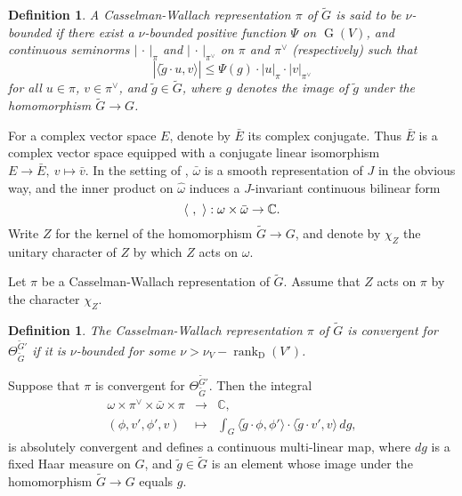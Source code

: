 \documentclass[lang = american]{ems-icm} %
\newcommand{\la}{\langle}
\newcommand{\ra}{\rangle}
\def\abs#1{\left|{#1}\right|}
\newcommand{\rank}{\operatorname{rank}}
\newcommand{\rD}{\mathrm D}
\newcommand{\oG}{\operatorname{G}}
\numberwithin{equation}{section}
\newtheorem{defn}[thm]{Definition}
\theoremstyle{remark}
\begin{document}
\begin{defn}
A Casselman-Wallach representation $\pi$ of $\widetilde G$ is said to be $\nu$-bounded if there
exist a $\nu$-bounded positive function $\Psi$ on $\oG(V)$, and continuous seminorms $\abs{\,\cdot\,}_{\pi}$ and $\abs{\,\cdot\,}_{\pi^\vee}$ on  $ \pi$ and $\pi^\vee$ (respectively) such that
\[
 \abs{ \la \tilde g \cdot u, v\ra}\leq \Psi(g)\cdot \abs{u}_{\pi}\cdot \abs{v}_{\pi^\vee}
\]
for all $u\in \pi$, $v\in \pi^\vee$, and $\tilde g\in \widetilde G$, where $g$ denotes the image of $\tilde g$ under the homomorphism $\widetilde G\rightarrow G$.

\end{defn}



For a complex vector space $E$, denote by $\bar E$ its complex conjugate. Thus $\bar E$ is a complex vector space equipped with a conjugate linear isomorphism  $E\rightarrow \bar E, \ v\mapsto \bar v$. In the setting of , $\bar \omega$ is a smooth representation of $J$ in the obvious way, and the inner product on $\widehat \omega$ induces a $J$-invariant continuous bilinear form
\[
  \langle\ ,\ \rangle :  \omega\times \bar \omega\rightarrow \C.
\]
Write $Z$ for the kernel of the homomorphism $\widetilde G\rightarrow G$, and denote by $\chi_Z$ the unitary character of $Z$ by which $Z$ acts on $\omega$.

Let $\pi$ be a Casselman-Wallach representation of $\widetilde{G}$. Assume that $Z$ acts on $\pi$ by the character $\chi_Z$.

\begin{defn}\label{defn:CRcov}
 The Casselman-Wallach representation $\pi$ of $\widetilde{G}$ is convergent for $\Theta_{\widetilde G}^{\widetilde G'}$ if it is $\nu$-bounded for some $\nu>\nu_{V}-\rank_{\rD}(V')$.
\end{defn}

Suppose that $\pi$ is convergent for $\Theta_{\widetilde G}^{\widetilde G'}$. Then the integral
\begin{equation}\label{mi1}
\begin{array}{rcl}
   \omega\times \pi^\vee \times  \bar \omega\times \pi &\rightarrow & \mathbb C, \\
    (\phi, v', \phi', v)&\mapsto  & \int_{G} \langle \tilde g\cdot\phi, \phi'\rangle \cdot \langle \tilde g\cdot v', v\rangle \, d g,
    \end{array}
\end{equation}
is absolutely convergent and defines a continuous multi-linear map, where $dg$ is a fixed Haar measure on $G$, and $\tilde g\in \widetilde{G}$  is an element whose image under the homomorphism $\widetilde{G}\rightarrow G$ equals $g$.
\end{document}
